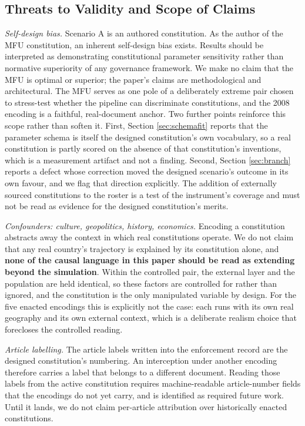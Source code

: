 \documentclass{ieeeaccess}
\begin{document}
\subsection{Threats to Validity and Scope of Claims}
\label{sec:threats}

\emph{Self-design bias.} Scenario A is an authored constitution. As the
author of the MFU constitution, an inherent self-design bias exists.
Results should be interpreted as demonstrating constitutional parameter
sensitivity rather than normative superiority of any governance
framework. We make no claim that the MFU is optimal or superior; the
paper's claims are methodological and architectural. The MFU serves as
one pole of a deliberately extreme pair chosen to stress-test whether
the pipeline can discriminate constitutions, and the 2008 encoding is a
faithful, real-document anchor. Two further points reinforce this scope
rather than soften it. First, Section \ref{sec:schemafit} reports that
the parameter schema is itself the designed constitution's own
vocabulary, so a real constitution is partly scored on the absence of
that constitution's inventions, which is a measurement artifact and not
a finding. Second, Section \ref{sec:branch} reports a defect whose
correction moved the designed scenario's outcome in its own favour, and
we flag that direction explicitly. The addition of externally sourced
constitutions to the roster is a test of the instrument's coverage and
must not be read as evidence for the designed constitution's merits.

\emph{Confounders: culture, geopolitics, history, economics.} Encoding a
constitution abstracts away the context in which real constitutions
operate. We do not claim that any real country's trajectory is explained
by its constitution alone, and \textbf{none of the causal language in
this paper should be read as extending beyond the simulation}. Within
the controlled pair, the external layer and the population are held
identical, so these factors are controlled for rather than ignored, and
the constitution is the only manipulated variable by design. For the
five enacted encodings this is explicitly not the case: each runs with
its own real geography and its own external context, which is a
deliberate realism choice that forecloses the controlled reading.

\emph{Article labelling.} The article labels written into the
enforcement record are the designed constitution's numbering. An
interception under another encoding therefore carries a label that
belongs to a different document. Reading those labels from the active
constitution requires machine-readable article-number fields that the
encodings do not yet carry, and is identified as required future work.
Until it lands, we do not claim per-article attribution over
historically enacted constitutions.
\end{document}
